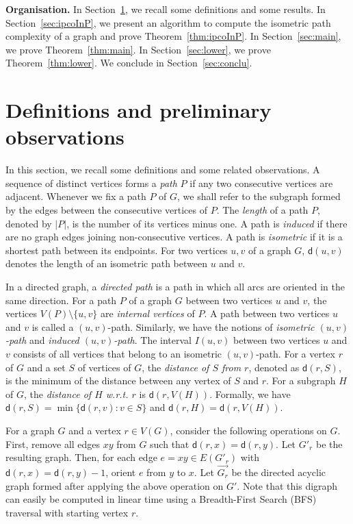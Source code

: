 \documentclass[a4paper]{article}
\newcommand{\dist}[2]{\mathsf{d}\left(#1,#2\right)}
\begin{document}
 \noindent \textbf{Organisation.} In Section~\ref{sec:prelim}, we recall some definitions and some results. In Section~\ref{sec:ipcoInP}, we present an algorithm to compute the isometric path complexity of a graph and prove Theorem~\ref{thm:ipcoInP}. In Section~\ref{sec:main}, we prove Theorem~\ref{thm:main}. In Section~\ref{sec:lower}, we prove Theorem~\ref{thm:lower}. We conclude in Section~\ref{sec:conclu}.





\section{Definitions and preliminary observations}\label{sec:prelim}

In this section, we recall some definitions and some related observations. A sequence of distinct vertices forms a \emph{path} $P$ if any two consecutive vertices are adjacent. 
Whenever we fix a path $P$ of $G$, we shall refer to the subgraph formed by the edges between the consecutive vertices of $P$. The \emph{length} of a path $P$, denoted by $|P|$, is the number of its vertices minus  one. A path is \emph{induced} if there are no graph edges joining non-consecutive vertices. A path is \emph{isometric} if it is a shortest path between its endpoints.  For two vertices $u,v$ of a graph $G$, $\dist{u}{v}$ denotes the length of an isometric path between $u$ and $v$. 

{In a directed graph, a \emph{directed path} is a path in which all arcs are oriented in the same direction.} For a path $P$ of a graph $G$ between two vertices $u$ and $v$, the vertices $V(P)\setminus \{u,v\}$ are \emph{internal vertices} of $P$. A path between two vertices $u$ and $v$ is called a $(u,v)$-path.  Similarly, we have the notions of \emph{isometric $(u,v)$-path} and \emph{induced $(u,v)$-path}. The interval $I(u,v)$ between two vertices $u$ and $v$ consists of all vertices that belong to an isometric $(u,v)$-path. For a vertex $r$ of $G$ and a set $S$ of vertices of $G$, the \emph{distance of $S$ from $r$}, denoted as $\dist{r}{S}$, is the minimum of the distance between any vertex of $S$ and $r$. For a subgraph $H$ of $G$, the \emph{distance of $H$ w.r.t. $r$} is $\dist{r}{V(H)}$. Formally, we have $\dist{r}{S}=\min\{\dist{r}{v}\colon v\in  S\}$ and $\dist{r}{H}=\dist{r}{V(H)}$.  

 For a graph $G$ and a vertex $r \in V(G)$, consider the following operations on $G$. First, remove all edges $xy$ from $G$ such that $\dist{r}{x}=\dist{r}{y}$. Let $G'_r$ be the resulting graph. Then, for each edge $e=xy\in E(G'_r)$ with $\dist{r}{x} = \dist{r}{y} - 1$, orient $e$ from $y$ to $x$. Let $\overrightarrow{G_r}$ be the directed acyclic graph formed after applying the above operation on $G'$. Note that this digraph can easily be computed in linear time using a Breadth-First Search (BFS) traversal with starting vertex $r$. 
 
\end{document}
